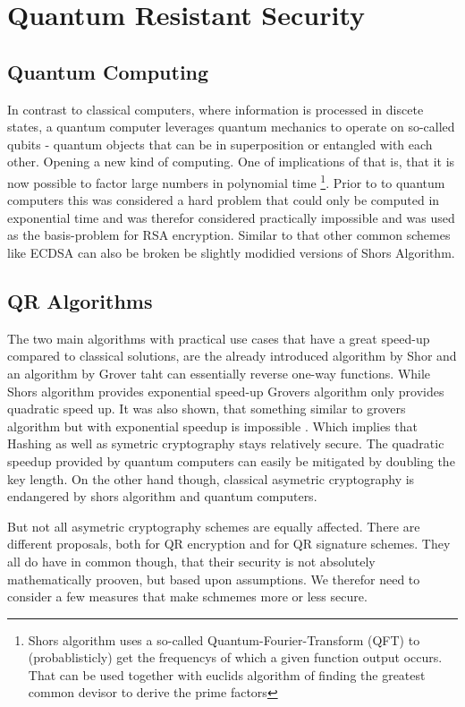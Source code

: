 \documentclass[conference]{IEEEtran}
\begin{document}
\section{Quantum Resistant Security}
\subsection{Quantum Computing}\label{quantum_computing}
In contrast to classical computers, where information is processed in discete states, a quantum computer leverages quantum mechanics to operate on so-called qubits - quantum objects that can be in superposition or entangled with each other. 
Opening a new kind of computing. 
One of implications of that is, that it is now possible to factor large numbers in polynomial time \cite{Shor} \footnote{Shors algorithm uses a so-called Quantum-Fourier-Transform (QFT) to (probablisticly) get the frequencys of which a given function output occurs. That can be used together with euclids algorithm of finding the greatest common devisor to derive the prime factors}. 
Prior to to quantum computers this was considered a hard problem that could only be computed in exponential time and was therefor considered practically impossible and was used as the basis-problem for RSA encryption.
Similar to that other common schemes like ECDSA can also be broken be slightly modidied versions of Shors Algorithm.
\subsection{QR Algorithms}
The two main algorithms with practical use cases that have a great speed-up compared to classical solutions, are the already introduced algorithm by Shor and an algorithm by Grover taht can essentially reverse one-way functions.
While Shors algorithm provides exponential speed-up Grovers algorithm only provides quadratic speed up. It was also shown, that something similar to grovers algorithm but with exponential speedup is impossible \cite{Strengths&Weaknesses_QC}. Which implies that Hashing as well as symetric cryptography stays relatively secure.
The quadratic speedup provided by quantum computers can easily be mitigated by doubling the key length.
On the other hand though, classical asymetric cryptography is endangered by shors algorithm and quantum computers.

But not all asymetric cryptography schemes are equally affected.
There are different proposals, both for QR encryption and for QR signature schemes.
They all do have in common though, that their security is not absolutely mathematically prooven, but based upon assumptions.
We therefor need to consider a few measures that make schmemes more or less secure.
\end{document}
